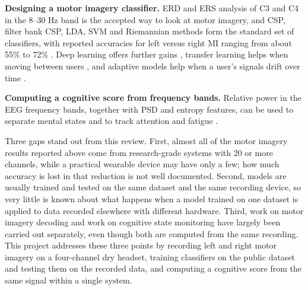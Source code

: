 \textbf{Designing a motor imagery classifier.} ERD and ERS analysis of C3 and C4 in the
8--30 Hz band is the accepted way to look at motor imagery, and CSP, filter bank CSP,
LDA, SVM and Riemannian methods form the standard set of classifiers, with reported
accuracies for left versus right MI ranging from about 55\% to 72\%
\cite{liu2024mi}. Deep learning offers further gains \cite{xu2023review,
song2023conformer}, transfer learning helps when moving between users
\cite{jerrin2021imagined}, and adaptive models help when a user's signals drift over time
\cite{su2024hybrid}.

\textbf{Computing a cognitive score from frequency bands.} Relative power in the EEG
frequency bands, together with PSD and entropy features, can be used to separate mental
states and to track attention and fatigue \cite{bird2018mental, jawed2024visual,
ming2021drowsiness, jiri2025drowsiness}.

Three gaps stand out from this review. First, almost all of the motor imagery results
reported above come from research-grade systems with 20 or more channels, while a practical
wearable device may have only a few; how much accuracy is lost in that reduction is not
well documented. Second, models are usually trained and tested on the same dataset and the
same recording device, so very little is known about what happens when a model trained on
one dataset is applied to data recorded elsewhere with different hardware. Third, work on
motor imagery decoding and work on cognitive state monitoring have largely been carried out
separately, even though both are computed from the same recording. This project addresses
these three points by recording left and right motor imagery on a four-channel dry
headset, training classifiers on the public dataset and testing them on the recorded data,
and computing a cognitive score from the same signal within a single system.